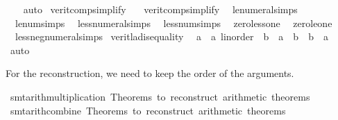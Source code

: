 \begin{isabellebody}
%
\isadelimproof
\ \ %
\endisadelimproof
%
\isatagproof
{}\isamarkupfalse%
\ auto%
\endisatagproof
{\isafoldproof}%
%
\isadelimproof
\isanewline
%
\endisadelimproof
\isanewline
{}\isamarkupfalse%
\ verit{\isacharunderscore}{\kern0pt}comp{\isacharunderscore}{\kern0pt}simplify\ {\isacharequal}{\kern0pt}\isanewline
\ \ verit{\isacharunderscore}{\kern0pt}comp{\isacharunderscore}{\kern0pt}simplify{}\isanewline
\ \ le{\isacharunderscore}{\kern0pt}numeral{\isacharunderscore}{\kern0pt}simps\isanewline
\ \ le{\isacharunderscore}{\kern0pt}num{\isacharunderscore}{\kern0pt}simps\isanewline
\ \ less{\isacharunderscore}{\kern0pt}numeral{\isacharunderscore}{\kern0pt}simps\isanewline
\ \ less{\isacharunderscore}{\kern0pt}num{\isacharunderscore}{\kern0pt}simps\isanewline
\ \ zero{\isacharunderscore}{\kern0pt}less{\isacharunderscore}{\kern0pt}one\isanewline
\ \ zero{\isacharunderscore}{\kern0pt}le{\isacharunderscore}{\kern0pt}one\isanewline
\ \ less{\isacharunderscore}{\kern0pt}neg{\isacharunderscore}{\kern0pt}numeral{\isacharunderscore}{\kern0pt}simps\isanewline
\isanewline
{}\isamarkupfalse%
\ verit{\isacharunderscore}{\kern0pt}la{\isacharunderscore}{\kern0pt}disequality{\isacharcolon}{\kern0pt}\isanewline
\ \ {\isacartoucheopen}{\isacharparenleft}{\kern0pt}a\ {\isacharcolon}{\kern0pt}{\isacharcolon}{\kern0pt}\ {\isacharprime}{\kern0pt}a\ {\isacharcolon}{\kern0pt}{\isacharcolon}{\kern0pt}linorder{\isacharparenright}{\kern0pt}\ {\isacharequal}{\kern0pt}\ b\ {\isasymor}\ {\isasymnot}a\ {\isasymle}\ b\ {\isasymor}\ {\isasymnot}b\ {\isasymle}\ a{\isacartoucheclose}\isanewline
%
\isadelimproof
\ \ %
\endisadelimproof
%
\isatagproof
{}\isamarkupfalse%
\ auto%
\endisatagproof
{\isafoldproof}%
%
\isadelimproof
\isanewline
%
\endisadelimproof
\isanewline
{}\isamarkupfalse%
\isanewline
{}%
\begin{isamarkuptext}%
For the reconstruction, we need to keep the order of the arguments.%
\end{isamarkuptext}\isamarkuptrue%
\isamarkupfalse%
\ smt{\isacharunderscore}{\kern0pt}arith{\isacharunderscore}{\kern0pt}multiplication\ {\isacartoucheopen}Theorems\ to\ reconstruct\ arithmetic\ theorems{\isachardot}{\kern0pt}{\isacartoucheclose}\isanewline
\isanewline
{}\isamarkupfalse%
\ smt{\isacharunderscore}{\kern0pt}arith{\isacharunderscore}{\kern0pt}combine\ {\isacartoucheopen}Theorems\ to\ reconstruct\ arithmetic\ theorems{\isachardot}{\kern0pt}{\isacartoucheclose}\isanewline

\end{isabellebody}
